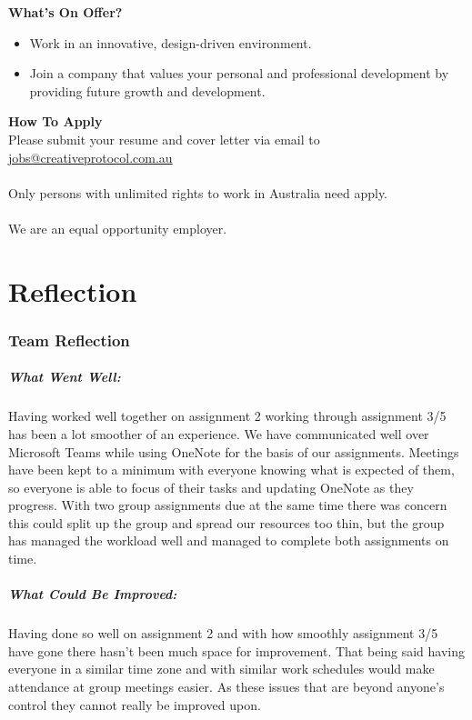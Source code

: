 \documentclass[11pt, oneside, a4paper, titlepage]{article}
\begin{document}
\hfill \break
\textbf{What's On Offer?}
\begin{itemize}
	\item Work in an innovative, design-driven environment. 
    	\item Join a company that values your personal and professional development by providing future growth and development.  
\end{itemize}
\hfill \break
\textbf{How To Apply}
\\
Please submit your resume and cover letter via email to \href{mailto:jobs@creativeprotocol.com.au}{jobs@creativeprotocol.com.au}
\\
\\
Only persons with unlimited rights to work in Australia need apply. 
\\
\\
We are an equal opportunity employer. 
\newpage


\part{Reflection}
\section{Team Reflection}
\subsubsection{What Went Well:}
Having worked well together on assignment 2 working through assignment 3/5 has been a lot smoother of an experience. We have communicated well over Microsoft Teams while using OneNote for the basis of our assignments. Meetings have been kept to a minimum with everyone knowing what is expected of them, so everyone is able to focus of their tasks and updating OneNote as they progress. With two group assignments due at the same time there was concern this could split up the group and spread our resources too thin, but the group has managed the workload well and managed to complete both assignments on time. 

\subsubsection{What Could Be Improved:}
Having done so well on assignment 2 and with how smoothly assignment 3/5 have gone there hasn't been much space for improvement. That being said having everyone in a similar time zone and with similar work schedules would make attendance at group meetings easier. As these issues that are beyond anyone's control they cannot really be improved upon. 
\end{document}
